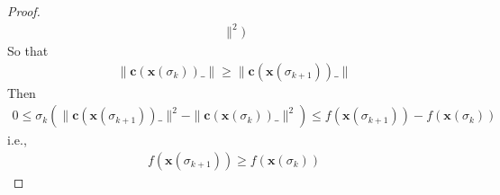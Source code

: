 \begin{proof}
\begin{align}
        \parallel^2)
    \end{align}
    So that
    \begin{align}
        \parallel \mathbf{c}(\mathbf{x}(\sigma_{k}))\_ 
        \parallel \geq \parallel \mathbf{c}(\mathbf{x}(\sigma_{k+1}))\_ 
        \parallel
    \end{align}
    Then
    \begin{align}
        0\leq \sigma_{k} (\parallel \mathbf{c}(\mathbf{x}(\sigma_{k+1}))\_ 
        \parallel^2 - \parallel \mathbf{c}(\mathbf{x}(\sigma_{k}))\_ 
        \parallel^2)
        \leq
        f(\mathbf{x}(\sigma_{k+1})) - f(\mathbf{x}(\sigma_{k}))
    \end{align}
    i.e.,
    \begin{align}
        f(\mathbf{x}(\sigma_{k+1})) \geq f(\mathbf{x}(\sigma_{k}))
    \end{align}
    
\end{proof}

